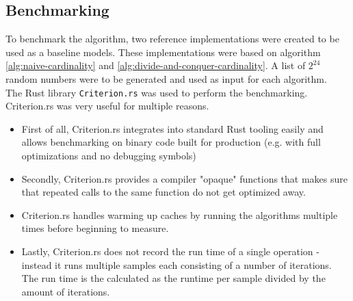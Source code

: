 \subsection{Benchmarking}
To benchmark the algorithm, two reference implementations were created to be used as a baseline models. These implementations were based on algorithm \ref{alg:naive-cardinality} and \ref{alg:divide-and-conquer-cardinality}. A list of $2^{24}$ random numbers were to be generated and used as input for each algorithm.\\
The Rust library \texttt{Criterion.rs}\cite{criterion} was used to perform the benchmarking. Criterion.rs was very useful for multiple reasons. 
\begin{itemize}
    \item First of all, Criterion.rs integrates into standard Rust tooling easily and allows benchmarking on binary code built for production (e.g. with full optimizations and no debugging symbols)
    \item Secondly, Criterion.rs provides a compiler "opaque" functions that makes sure that repeated calls to the same function do not get optimized away.
    \item Criterion.rs handles warming up caches by running the algorithms multiple times before beginning to measure.
    \item Lastly, Criterion.rs does not record the run time of a single operation - instead it runs multiple samples each consisting of a number of iterations. The run time is the calculated as the runtime per sample divided by the amount of iterations. 
\end{itemize}

